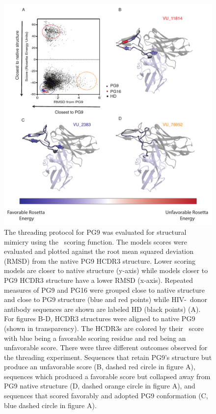 \begin{figure}
   \centering
   \includegraphics[width=\columnwidth]{images/chapter3/figure3_9.pdf} %
   \caption[Threading PG9 Produces Three Structural Outcomes]{The threading protocol for PG9 was evaluated for structural mimicry using the \rosetta~scoring function. The models scores were evaluated and plotted against the root mean squared deviation (RMSD) from the native PG9 HCDR3 structure. Lower scoring models are closer to native structure (y-axis) while models closer to PG9 HCDR3 structure have a lower RMSD (x-axis). Repeated measures of PG9 and PG16 were grouped close to native structure and close to PG9 structure (blue and red points) while HIV-\naive~donor antibody sequences are shown are labeled HD (black points) (A). For figures B-D, HCDR3 structures were aligned to native PG9 (shown in transparency). The HCDR3s are colored by their \rosetta~score with blue being a favorable scoring residue and red being an unfavorable score. There were three different outcomes observed for the threading experiment. Sequences that retain PG9's structure but produce an unfavorable score (B, dashed red circle in figure A), sequences which produced a favorable score but collapsed away from PG9 native structure (D, dashed orange circle in figure A), and sequences that scored favorably and adopted PG9 conformation (C, blue dashed circle in figure A).}
   \label{fig:figure3_9}
\end{figure}


